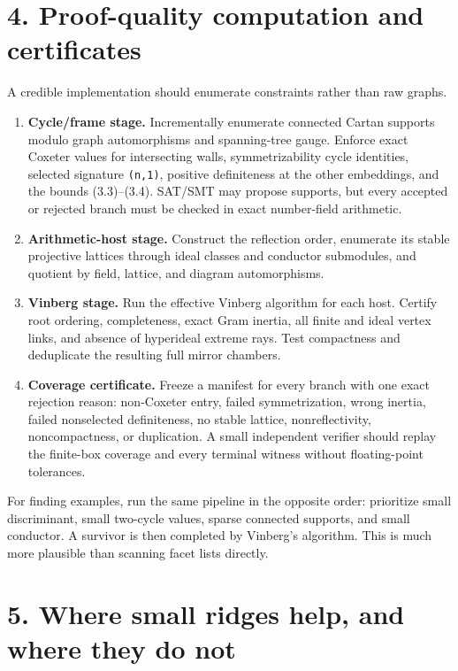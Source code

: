 \documentclass[
  10pt,
]{report}
\providecommand{\tightlist}{%
  \setlength{\itemsep}{0pt}\setlength{\parskip}{0pt}}
\begin{document}
\section{4. Proof-quality computation and
certificates}\label{proof-quality-computation-and-certificates}

A credible implementation should enumerate constraints rather than raw
graphs.

\begin{enumerate}
\def\labelenumi{\arabic{enumi}.}
\tightlist
\item
  \textbf{Cycle/frame stage.} Incrementally enumerate connected Cartan
  supports modulo graph automorphisms and spanning-tree gauge. Enforce
  exact Coxeter values for intersecting walls, symmetrizability cycle
  identities, selected signature \texttt{(n,1)}, positive definiteness
  at the other embeddings, and the bounds (3.3)--(3.4). SAT/SMT may
  propose supports, but every accepted or rejected branch must be
  checked in exact number-field arithmetic.
\item
  \textbf{Arithmetic-host stage.} Construct the reflection order,
  enumerate its stable projective lattices through ideal classes and
  conductor submodules, and quotient by field, lattice, and diagram
  automorphisms.
\item
  \textbf{Vinberg stage.} Run the effective Vinberg algorithm for each
  host. Certify root ordering, completeness, exact Gram inertia, all
  finite and ideal vertex links, and absence of hyperideal extreme rays.
  Test compactness and deduplicate the resulting full mirror chambers.
\item
  \textbf{Coverage certificate.} Freeze a manifest for every branch with
  one exact rejection reason: non-Coxeter entry, failed symmetrization,
  wrong inertia, failed nonselected definiteness, no stable lattice,
  nonreflectivity, noncompactness, or duplication. A small independent
  verifier should replay the finite-box coverage and every terminal
  witness without floating-point tolerances.
\end{enumerate}

For finding examples, run the same pipeline in the opposite order:
prioritize small discriminant, small two-cycle values, sparse connected
supports, and small conductor. A survivor is then completed by Vinberg's
algorithm. This is much more plausible than scanning facet lists
directly.

\section{5. Where small ridges help, and where they do
not}\label{where-small-ridges-help-and-where-they-do-not}
\end{document}
